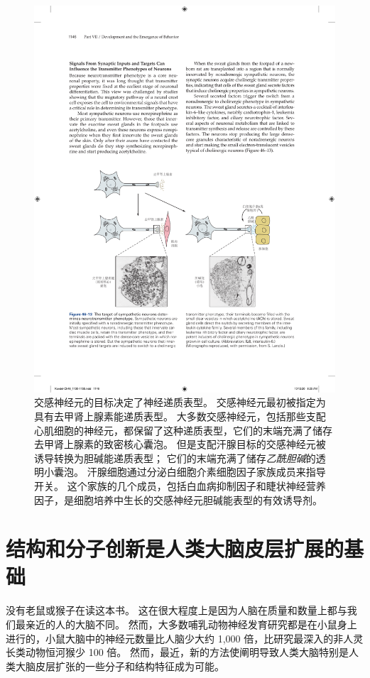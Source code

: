 \begin{figure}[htbp]
	\centering
	\includegraphics[width=0.8\linewidth]{chap46/fig_46_13}
	\caption{交感神经元的目标决定了神经递质表型。
		交感神经元最初被指定为具有去甲肾上腺素能递质表型。
		大多数交感神经元，包括那些支配心肌细胞的神经元，都保留了这种递质表型，它们的末端充满了储存去甲肾上腺素的致密核心囊泡。
		但是支配汗腺目标的交感神经元被诱导转换为胆碱能递质表型；
		它们的末端充满了储存\textit{乙酰胆碱}的透明小囊泡。
		汗腺细胞通过分泌白细胞介素细胞因子家族成员来指导开关。
		这个家族的几个成员，包括白血病抑制因子和睫状神经营养因子，是细胞培养中生长的交感神经元胆碱能表型的有效诱导剂。}
	\label{fig:46_13}
\end{figure}



\section{结构和分子创新是人类大脑皮层扩展的基础}

没有老鼠或猴子在读这本书。
这在很大程度上是因为人脑在质量和数量上都与我们最亲近的人的大脑不同。
然而，大多数哺乳动物神经发育研究都是在小鼠身上进行的，小鼠大脑中的神经元数量比人脑少大约 1,000 倍，比研究最深入的非人灵长类动物恒河猴少 100 倍。
然而，最近，新的方法使阐明导致人类大脑特别是人类大脑皮层扩张的一些分子和结构特征成为可能。


